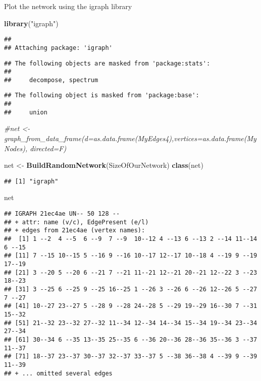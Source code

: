 \documentclass[]{article}
\newenvironment{Shaded}{\begin{snugshade}}{\end{snugshade}}
\newcommand{\CommentTok}[1]{\textcolor[rgb]{0.56,0.35,0.01}{\textit{#1}}}
\newcommand{\KeywordTok}[1]{\textcolor[rgb]{0.13,0.29,0.53}{\textbf{#1}}}
\newcommand{\NormalTok}[1]{#1}
\newcommand{\StringTok}[1]{\textcolor[rgb]{0.31,0.60,0.02}{#1}}
\begin{document}
Plot the network using the igraph library

\begin{Shaded}
\begin{Highlighting}[]
\KeywordTok{library}\NormalTok{(}\StringTok{"igraph"}\NormalTok{)}
\end{Highlighting}
\end{Shaded}

\begin{verbatim}
## 
## Attaching package: 'igraph'
\end{verbatim}

\begin{verbatim}
## The following objects are masked from 'package:stats':
## 
##     decompose, spectrum
\end{verbatim}

\begin{verbatim}
## The following object is masked from 'package:base':
## 
##     union
\end{verbatim}

\begin{Shaded}
\begin{Highlighting}[]
\CommentTok{#net <- graph_from_data_frame(d=as.data.frame(MyEdges4),vertices=as.data.frame(MyNodes), directed=F) }

\NormalTok{net <-}\StringTok{ }\KeywordTok{BuildRandomNetwork}\NormalTok{(SizeOfOurNetwork)}
\KeywordTok{class}\NormalTok{(net)}
\end{Highlighting}
\end{Shaded}

\begin{verbatim}
## [1] "igraph"
\end{verbatim}

\begin{Shaded}
\begin{Highlighting}[]
\NormalTok{net }
\end{Highlighting}
\end{Shaded}

\begin{verbatim}
## IGRAPH 21ec4ae UN-- 50 128 -- 
## + attr: name (v/c), EdgePresent (e/l)
## + edges from 21ec4ae (vertex names):
##  [1] 1 --2  4 --5  6 --9  7 --9  10--12 4 --13 6 --13 2 --14 11--14 6 --15
## [11] 7 --15 10--15 5 --16 9 --16 10--17 12--17 10--18 4 --19 9 --19 17--19
## [21] 3 --20 5 --20 6 --21 7 --21 11--21 12--21 20--21 12--22 3 --23 18--23
## [31] 3 --25 6 --25 9 --25 16--25 1 --26 3 --26 6 --26 12--26 5 --27 7 --27
## [41] 10--27 23--27 5 --28 9 --28 24--28 5 --29 19--29 16--30 7 --31 15--32
## [51] 21--32 23--32 27--32 11--34 12--34 14--34 15--34 19--34 23--34 27--34
## [61] 30--34 6 --35 13--35 25--35 6 --36 20--36 28--36 35--36 3 --37 11--37
## [71] 18--37 23--37 30--37 32--37 33--37 5 --38 36--38 4 --39 9 --39 11--39
## + ... omitted several edges
\end{verbatim}
\end{document}
